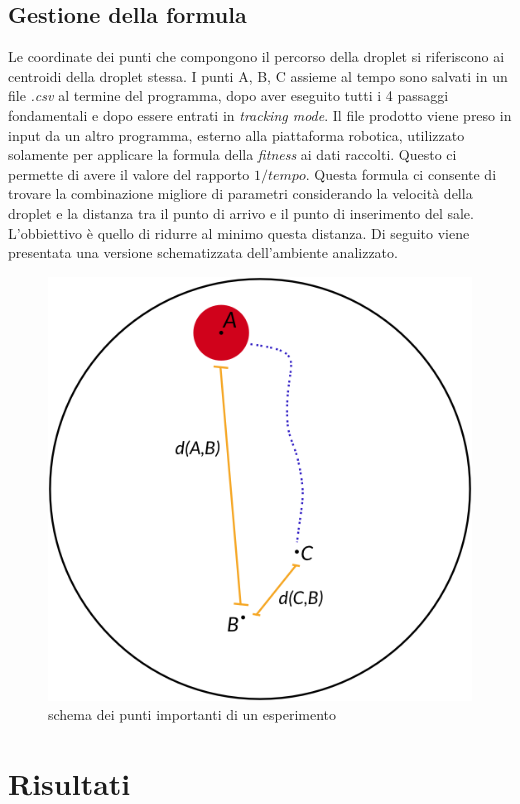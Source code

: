 \subsection{Gestione della formula}
Le coordinate dei punti che compongono il percorso della droplet si riferiscono ai centroidi della droplet stessa. I punti A, B, C assieme al tempo sono salvati in un file \emph{.csv} al termine del programma, dopo aver eseguito tutti i 4 passaggi fondamentali e dopo essere entrati in \emph{tracking mode}. Il file prodotto viene preso in input da un altro programma, esterno alla piattaforma robotica, utilizzato solamente per applicare la formula della \emph{fitness} ai dati raccolti. Questo ci permette di avere il valore del rapporto $1/tempo$. Questa formula ci consente di trovare la combinazione migliore di parametri considerando la velocità della droplet e la distanza tra il punto di arrivo e il punto di inserimento del sale. L'obbiettivo è quello di ridurre al minimo questa distanza. Di seguito viene presentata una versione schematizzata dell'ambiente analizzato.
 \begin{figure}[h]
	  \includegraphics[scale=0.30]{immagini/schema.png}
		\centering
	 \caption{schema dei punti importanti di un esperimento}
\end{figure} 
\pagebreak
\section{Risultati}

